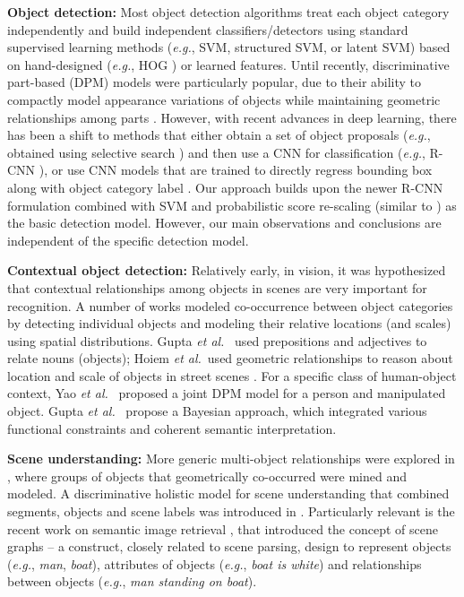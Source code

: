 \documentclass[runningheads]{llncs}
\makeatletter
\newcommand*{\eg}{{\em e.g.}\@\xspace}
\newcommand*{\etal}{{\em et al.}\@\xspace}
\makeatother
\begin{document}
\vspace{0.05in}
\noindent
{\bf Object detection:} Most object detection algorithms treat each object category independently and build independent classifiers/detectors using standard supervised learning methods (\eg, SVM, structured SVM, or latent SVM) based on hand-designed (\eg, HOG \cite{Dalal2005}) or learned features. Until recently, discriminative part-based (DPM) models \cite{Felzenszwalb2010} were particularly popular, due to their ability to compactly model appearance variations of objects while maintaining geometric relationships among parts \cite{Yang2011}. However, with recent advances in deep learning, there has been a shift to methods that either obtain a set of object proposals (\eg, obtained using selective search \cite{Uijlings2013}) and then use a CNN for classification (\eg, R-CNN \cite{Girshick2014}), or use CNN models that are trained to directly regress bounding box along with object category label \cite{Szegedy2013}. Our approach builds upon the newer R-CNN formulation \cite{girshick15fastrcnn} combined with SVM and probabilistic score re-scaling (similar to \cite{Johnson2015}) as the basic detection model. However, our main observations and conclusions are independent of the specific detection model. 

\vspace{0.05in}
\noindent
{\bf Contextual object detection:} Relatively early, in vision, it was hypothesized that contextual relationships among objects in scenes are very important for recognition. A number of works modeled co-occurrence between object categories by detecting individual objects and modeling their relative locations (and scales) using spatial distributions. Gupta \etal~\cite{Gupta2008} used prepositions and adjectives to relate nouns (objects); Hoiem \etal~used geometric relationships to reason about location and scale of objects in street scenes \cite{Hoiem2006}. For a specific class of human-object context, Yao \etal~\cite{Yao2010} proposed a joint DPM model for a person and manipulated object. Gupta \etal~\cite{Gupta2009} propose a Bayesian approach, which integrated various functional constraints and coherent semantic interpretation. 

\vspace{0.05in}
\noindent
{\bf Scene understanding:} More generic multi-object relationships were explored in \cite{Li2012}, where groups of objects that geometrically co-occurred were mined and modeled. A discriminative holistic model for scene understanding that combined segments, objects and scene labels was introduced in \cite{Yao2012}. Particularly relevant is the recent work on semantic image retrieval \cite{Johnson2015}, that introduced the concept of scene graphs -- a construct, closely related to scene parsing, design to represent objects (\eg, {\em man}, {\em boat}), attributes of objects (\eg, {\em boat is white}) and relationships between objects (\eg, {\em man standing on boat}).
\end{document}

